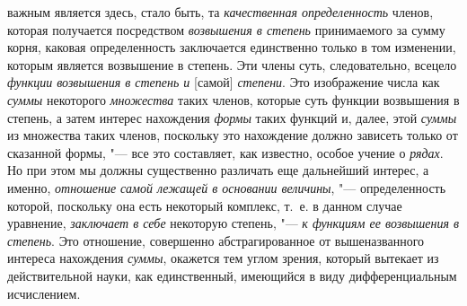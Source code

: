 важным является здесь, стало быть, та {\em качественная
определенность} членов, которая получается посредством
{\em возвышения в степень} принимаемого за сумму корня,
каковая определенность заключается единственно только в том изменении,
которым является возвышение в степень. Эти члены суть, следовательно,
всецело {\em функции возвышения в степень и} [самой]
{\em степени}. Это изображение числа как
{\em суммы} некоторого
{\em множества} таких членов, которые суть функции
возвышения в степень, а затем интерес нахождения
{\em формы} таких функций и, далее, этой
{\em суммы} из множества таких членов, поскольку это
нахождение должно зависеть только от сказанной формы, "--- все это составляет,
как известно, особое учение о {\em рядах}. Но при этом
мы должны существенно различать еще дальнейший интерес, а именно,
{\em отношение самой лежащей в основании величины}, "---
определенность которой, поскольку она есть некоторый комплекс, т.~е. в
данном случае уравнение, {\em заключает в себе}
некоторую степень, "--- {\em к функциям ее возвышения в
степень}. Это отношение, совершенно абстрагированное от вышеназванного
интереса нахождения {\em суммы}, окажется тем углом
зрения, который вытекает из действительной науки, как единственный,
имеющийся в виду дифференциальным исчислением.

